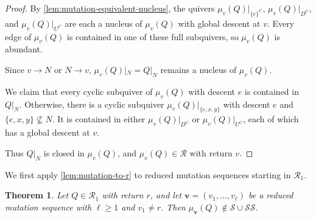 \documentclass[10pt,a4paper]{amsart}
\newtheorem{theorem}{Theorem}[section]
\theoremstyle{definition}
\theoremstyle{definition}
\numberwithin{equation}{section}
\numberwithin{table}{section}
\newcommand{\Rclass}{\mathcal{R}}
\newcommand{\SSclass}{\mathcal{SS}}
\newcommand{\Sclass}{\mathcal{S}}
\begin{document}
\begin{proof}
By \cref{lem:mutation-equivalent-nucleus}, the quivers
$\mu_v(Q)|_{\{e\}^C}$, $\mu_v(Q)|_{D^C}$, and $\mu_v(Q)|_{U^C}$
are each a nucleus of $\mu_v(Q)$ with global descent at $v$.
Every edge of $\mu_v(Q)$ is contained in one of these full subquivers, so $\mu_v(Q)$ is abundant.

Since $v\to N$ or $N\to v$, $\mu_v(Q)|_N=Q|_N$ remains a nucleus of
$\mu_v(Q)$.

We claim that every cyclic subquiver of $\mu_v(Q)$ with descent $e$ is
contained in $Q|_N$. Otherwise, there is a cyclic subquiver
$\mu_v(Q)|_{\{e,x,y\}}$ with descent $e$ and $\{e,x,y\}\nsubseteq N$.
It is contained in either $\mu_v(Q)|_{D^C}$ or $\mu_v(Q)|_{U^C}$,
each of which has a global descent at $v$.

Thus $Q|_N$ is closed in $\mu_v(Q)$, and $\mu_v(Q)\in\Rclass$ with
return $v$.
\end{proof}

We first apply \cref{lem:mutation-to-r} to reduced mutation sequences
starting in $\Rclass_1$.

\begin{theorem}\label{thm:r1-sequences}
Let $Q\in\Rclass_1$ with return $r$, and let
$\mathbf v=(v_1,\ldots,v_\ell)$ be a reduced mutation sequence with
$\ell\ge1$ and $v_1\ne r$. Then $\mu_{\mathbf v}(Q)\notin\Sclass\cup\SSclass$.
\end{theorem}
\end{document}
